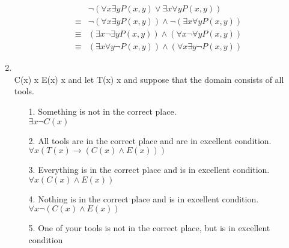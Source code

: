 \documentclass[11pt]{article}
\begin{document}
\begin{enumerate}
\begin{align*}
& \neg (\forall x \exists y P(x, y) \lor \exists x \forall y P(x, y)) \\
\equiv & \neg (\forall x \exists y P(x, y)) \land \neg (\exists x \forall y P(x, y)) \\
\equiv & (\exists x \neg \exists y P(x, y)) \land (\forall x \neg \forall y P(x, y)) \\
\equiv & (\exists x \forall y \neg P(x, y)) \land (\forall x \exists y \neg P(x, y))
\end{align*}


\newpage
\item {} \\
 C(x)  x  E(x)  x  {and let } T(x)  x  {and suppose that the domain consists of all tools.}

  \begin{enumerate}
  \item[1.] Something is not in the correct place.\\

  $\exists x \neg C(x)$\\

  
  \item[2.] All tools are in the correct place and are in excellent condition.\\

$\forall x (T(x) \rightarrow (C(x) \land E(x)))$\\


  \item[3.]Everything is in the correct place and is in excellent condition.\\

  $\forall x (C(x) \land E(x))$\\


  \item[4.]Nothing is in the correct place and is in excellent condition.\\
  
$\forall x \neg (C(x) \land E(x))$\\


  \item[5.]One of your tools is not in the correct place, but is in excellent condition\\


\end{enumerate}
\end{enumerate}
\end{document}
